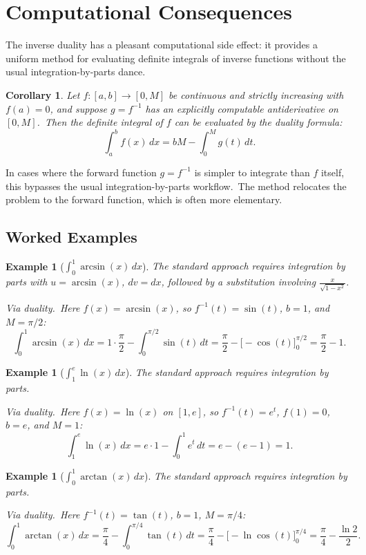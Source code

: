 \documentclass[11pt,a4paper]{article}
\newtheorem{corollary}[theorem]{Corollary}
\newtheorem{example}[theorem]{Example}
\begin{document}
\section{Computational Consequences}

The inverse duality has a pleasant computational side effect: it provides a uniform method for evaluating definite integrals of inverse functions without the usual integration-by-parts dance.

\begin{corollary}\label{cor:comp}
Let $f:[a,b]\to[0,M]$ be continuous and strictly increasing with $f(a)=0$, and suppose $g=f^{-1}$ has an explicitly computable antiderivative on $[0,M]$.\ Then the definite integral of $f$ can be evaluated by the duality formula:
\[
\int_a^b f(x)\,dx = bM - \int_0^M g(t)\,dt.
\]
\end{corollary}

In cases where the forward function $g=f^{-1}$ is simpler to integrate than $f$ itself, this bypasses the usual integration-by-parts workflow.\ The method relocates the problem to the forward function, which is often more elementary.

\subsection{Worked Examples}

\begin{example}[$\int_0^1\arcsin(x)\,dx$]\label{ex:arcsin}
The standard approach requires integration by parts with $u=\arcsin(x)$, $dv=dx$, followed by a substitution involving $\frac{x}{\sqrt{1-x^2}}$.

\emph{Via duality.}\ Here $f(x)=\arcsin(x)$, so $f^{-1}(t)=\sin(t)$, $b=1$, and $M=\pi/2$:
\[
\int_0^1\arcsin(x)\,dx = 1\cdot\frac{\pi}{2} - \int_0^{\pi/2}\sin(t)\,dt = \frac{\pi}{2} - \bigl[-\cos(t)\bigr]_0^{\pi/2} = \frac{\pi}{2}-1.
\]
\end{example}

\begin{example}[$\int_1^e\ln(x)\,dx$]\label{ex:ln}
The standard approach requires integration by parts.

\emph{Via duality.}\ Here $f(x)=\ln(x)$ on $[1,e]$, so $f^{-1}(t)=e^t$, $f(1)=0$, $b=e$, and $M=1$:
\[
\int_1^e\ln(x)\,dx = e\cdot 1 - \int_0^1 e^t\,dt = e-(e-1) = 1.
\]
\end{example}

\begin{example}[$\int_0^1\arctan(x)\,dx$]\label{ex:arctan}
The standard approach requires integration by parts.

\emph{Via duality.}\ Here $f^{-1}(t)=\tan(t)$, $b=1$, $M=\pi/4$:
\[
\int_0^1\arctan(x)\,dx = \frac{\pi}{4} - \int_0^{\pi/4}\tan(t)\,dt = \frac{\pi}{4} - \bigl[-\ln\cos(t)\bigr]_0^{\pi/4} = \frac{\pi}{4} - \frac{\ln 2}{2}.
\]
\end{example}
\end{document}
